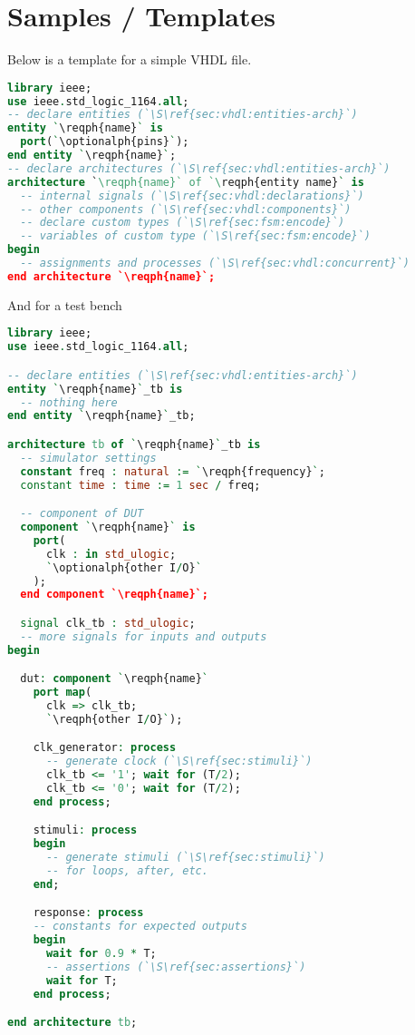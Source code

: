 \section{Samples / Templates}

Below is a template for a simple VHDL file.

\begin{lstlisting}[language=vhdl]
library ieee;
use ieee.std_logic_1164.all;
-- declare entities (`\S\ref{sec:vhdl:entities-arch}`)
entity `\reqph{name}` is
  port(`\optionalph{pins}`);
end entity `\reqph{name}`;
-- declare architectures (`\S\ref{sec:vhdl:entities-arch}`)
architecture `\reqph{name}` of `\reqph{entity name}` is
  -- internal signals (`\S\ref{sec:vhdl:declarations}`)
  -- other components (`\S\ref{sec:vhdl:components}`)
  -- declare custom types (`\S\ref{sec:fsm:encode}`)
  -- variables of custom type (`\S\ref{sec:fsm:encode}`)
begin
  -- assignments and processes (`\S\ref{sec:vhdl:concurrent}`)
end architecture `\reqph{name}`;
\end{lstlisting}
And for a test bench
\begin{lstlisting}[language=vhdl]
library ieee;
use ieee.std_logic_1164.all;

-- declare entities (`\S\ref{sec:vhdl:entities-arch}`)
entity `\reqph{name}`_tb is
  -- nothing here
end entity `\reqph{name}`_tb;

architecture tb of `\reqph{name}`_tb is
  -- simulator settings
  constant freq : natural := `\reqph{frequency}`;
  constant time : time := 1 sec / freq;

  -- component of DUT
  component `\reqph{name}` is
    port(
      clk : in std_ulogic;
      `\optionalph{other I/O}`
    );
  end component `\reqph{name}`;

  signal clk_tb : std_ulogic;
  -- more signals for inputs and outputs
begin

  dut: component `\reqph{name}`
    port map(
      clk => clk_tb;
      `\reqph{other I/O}`);

    clk_generator: process
      -- generate clock (`\S\ref{sec:stimuli}`)
      clk_tb <= '1'; wait for (T/2);
      clk_tb <= '0'; wait for (T/2);
    end process;

    stimuli: process
    begin
      -- generate stimuli (`\S\ref{sec:stimuli}`)
      -- for loops, after, etc.
    end;

    response: process
    -- constants for expected outputs
    begin
      wait for 0.9 * T;
      -- assertions (`\S\ref{sec:assertions}`)
      wait for T;
    end process;

end architecture tb;

\end{lstlisting}
